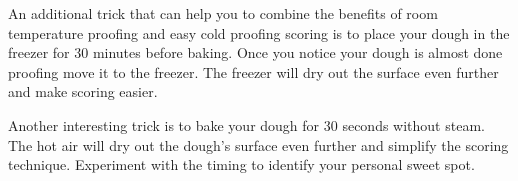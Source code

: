 An additional trick that can help you to combine the benefits
of room temperature proofing and easy cold proofing scoring
is to place your dough in the freezer for 30 minutes before baking.
Once you notice your dough is almost done proofing move it to the
freezer. The freezer will dry out the surface even further and make
scoring easier.

Another interesting trick is to bake your dough for 30 seconds without steam.
The hot air will dry out the dough's surface even further and simplify
the scoring technique. Experiment with the timing to identify your personal
sweet spot.
